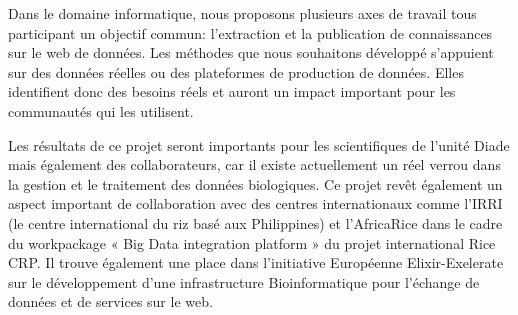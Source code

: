 Dans le domaine informatique, nous proposons plusieurs axes de travail tous participant un objectif commun: l'extraction et la publication de connaissances sur le web de données. Les méthodes que nous souhaitons développé s'appuient sur des données réelles ou des plateformes de production de données. Elles identifient donc des besoins réels et auront un impact important pour les communautés qui les utilisent.

Les résultats de ce projet seront importants pour les scientifiques de l’unité Diade mais également des collaborateurs, car il existe actuellement un réel verrou dans la gestion et le traitement des données biologiques. Ce projet revêt également un aspect important de collaboration avec des centres internationaux comme l’IRRI (le centre international du riz basé aux Philippines) et l'AfricaRice dans le cadre du workpackage « Big Data integration platform » du projet international Rice CRP. Il trouve également une place dans l'initiative Européenne Elixir-Exelerate sur le développement d'une infrastructure Bioinformatique pour l'échange de données et de services sur le web.  



